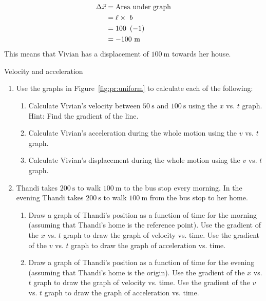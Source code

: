     \begin{align*}
    \Delta \vec{x} &= \text{Area}~\text{under}~\text{graph}\\ 
		   &= \ell \ensuremath{\times}~b\\ 
		    &= 100~\left(-1\right)\hfill \\ 
		  &= -100~\text{m}
      \end{align*}
        \label{m38795*id71010}This means that Vivian has a displacement of $100~\text{m}$ towards her house.\par 
\label{m38795*secfhsst!!!underscore!!!id2587}
\begin{exercises}{Velocity and acceleration }
            \nopagebreak \noindent\vspace{-1cm}
        \label{m38795*id71023}\begin{enumerate}[noitemsep, label=\textbf{\arabic*}. ] 
            \label{m38795*uid94}\item Use the graphs in Figure~\ref{fig:pr:uniform} to calculate each of the following:
\label{m38795*id71044}\begin{enumerate}[noitemsep, label=\textbf{\alph*}. ] 
            \label{m38795*uid95}\item Calculate Vivian's velocity between $50~\text{s}$ and $100~\text{s}$ using the $x$ vs. $t$ graph. Hint: Find the gradient of the line.
\label{m38795*uid96}\item Calculate Vivian's acceleration during the whole motion using the $v$ vs. $t$ graph.
\label{m38795*uid97}\item Calculate Vivian's displacement during the whole motion using the $v$ vs. $t$ graph.
\end{enumerate}
                \label{m38795*uid98}\item Thandi takes $200~\text{s}$ to walk $100~\text{m}$ to the bus stop every morning. In the evening Thandi takes $200~\text{s}$ to walk $100~\text{m}$ from the bus stop to her home.\label{m38795*id7103444}\begin{enumerate}[noitemsep, label=\textbf{\alph*}. ] 
            \label{m38795*uid9523}\item  Draw a graph of Thandi's position as a function of time for the morning (assuming that Thandi's home is the reference point). Use the gradient of the $x$ vs. $t$ graph to draw the graph of velocity vs. time. Use the gradient of the $v$ vs. $t$ graph to draw the graph of acceleration vs. time.
\label{m38795*uid99}\item  Draw a graph of Thandi's position as a function of time for the evening (assuming that Thandi's home is the origin). Use the gradient of the $x$ vs. $t$ graph to draw the graph of velocity vs. time. Use the gradient of the $v$ vs. $t$ graph to draw the graph of acceleration vs. time.

\end{enumerate}
\end{enumerate}
\end{exercises}
